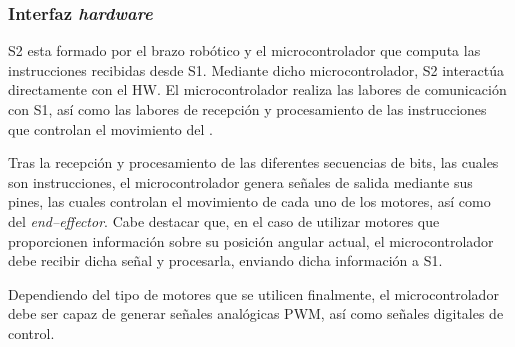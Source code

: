 \subsubsection{Interfaz \textit{hardware}}
\ac{S2} esta formado por el brazo robótico \pArm{} y el microcontrolador que computa las instrucciones recibidas desde \ac{S1}. Mediante dicho microcontrolador, \ac{S2} interactúa directamente con el \ac{HW}. El microcontrolador realiza las labores de comunicación con \ac{S1}, así como las labores de recepción y procesamiento de las instrucciones que controlan el movimiento del \pArm{}.

Tras la recepción y procesamiento de las diferentes secuencias de bits, las cuales son instrucciones, el microcontrolador genera señales de salida mediante sus pines, las cuales controlan el movimiento de cada uno de los motores, así como del \textit{end--effector}. Cabe destacar que, en el caso de utilizar motores que proporcionen información sobre su posición angular actual, el microcontrolador debe recibir dicha señal y procesarla, enviando dicha información a \ac{S1}.

Dependiendo del tipo de motores que se utilicen finalmente, el microcontrolador debe ser capaz de generar señales analógicas \ac{PWM}, así como señales digitales de control.





